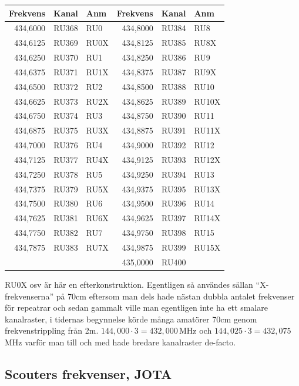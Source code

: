 \begin{longtable}{rrl|rrl}
\end{longtable}

\clearpage
\begin{longtable}{rrl|rrl}
\textbf{Frekvens} & \textbf{Kanal} & \textbf{Anm}   
&  \textbf{Frekvens} & \textbf{Kanal} & \textbf{Anm} \\ \hline

434,6000 & RU368 & RU0  & 434,8000 & RU384 & RU8   \\
434,6125 & RU369 & RU0X & 434,8125 & RU385 & RU8X  \\
434,6250 & RU370 & RU1  & 434,8250 & RU386 & RU9   \\
434,6375 & RU371 & RU1X & 434,8375 & RU387 & RU9X  \\
434,6500 & RU372 & RU2  & 434,8500 & RU388 & RU10  \\
434,6625 & RU373 & RU2X & 434,8625 & RU389 & RU10X \\
434,6750 & RU374 & RU3  & 434,8750 & RU390 & RU11  \\
434,6875 & RU375 & RU3X & 434,8875 & RU391 & RU11X \\
434,7000 & RU376 & RU4  & 434,9000 & RU392 & RU12  \\
434,7125 & RU377 & RU4X & 434,9125 & RU393 & RU12X \\
434,7250 & RU378 & RU5  & 434,9250 & RU394 & RU13  \\
434,7375 & RU379 & RU5X & 434,9375 & RU395 & RU13X \\
434,7500 & RU380 & RU6  & 434,9500 & RU396 & RU14  \\
434,7625 & RU381 & RU6X & 434,9625 & RU397 & RU14X \\
434,7750 & RU382 & RU7  & 434,9750 & RU398 & RU15  \\
434,7875 & RU383 & RU7X & 434,9875 & RU399 & RU15X \\
         &       &      & 435,0000 & RU400 &       \\

\end{longtable}

RU0X osv är här en efterkonstruktion. Egentligen så användes sällan ``X-frekvenserna'' på 70cm eftersom man dels hade nästan dubbla antalet frekvenser för repeatrar och sedan gammalt ville man egentligen inte ha ett smalare kanalraster, i tidernas begynnelse körde många amatörer 70cm genom frekvenstrippling från 2m. $144,000 \cdot 3 = 432,000$\,MHz och $144,025 \cdot 3 = 432,075$\,MHz varför man till och med hade bredare kanalraster de-facto.


\subsection{Scouters frekvenser, JOTA}

